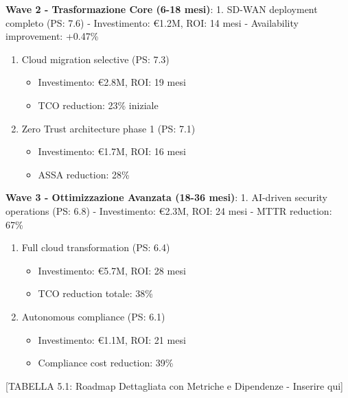 \documentclass[12pt,a4paper,oneside]{book}
\providecommand{\tightlist}{%
  \setlength{\itemsep}{0pt}\setlength{\parskip}{0pt}
}
\numberwithin{figure}{chapter} %
\numberwithin{table}{chapter}  %
\begin{document}
\textbf{Wave 2 - Trasformazione Core (6-18 mesi)}: 1. SD-WAN deployment
completo (PS: 7.6) - Investimento: €1.2M, ROI: 14 mesi - Availability
improvement: +0.47\%

\begin{enumerate}
\def\labelenumi{\arabic{enumi}.}
\setcounter{enumi}{1}
\tightlist
\item
  Cloud migration selective (PS: 7.3)

  \begin{itemize}
  \tightlist
  \item
    Investimento: €2.8M, ROI: 19 mesi
  \item
    TCO reduction: 23\% iniziale
  \end{itemize}
\item
  Zero Trust architecture phase 1 (PS: 7.1)

  \begin{itemize}
  \tightlist
  \item
    Investimento: €1.7M, ROI: 16 mesi
  \item
    ASSA reduction: 28\%
  \end{itemize}
\end{enumerate}

\textbf{Wave 3 - Ottimizzazione Avanzata (18-36 mesi)}: 1. AI-driven
security operations (PS: 6.8) - Investimento: €2.3M, ROI: 24 mesi - MTTR
reduction: 67\%

\begin{enumerate}
\def\labelenumi{\arabic{enumi}.}
\setcounter{enumi}{1}
\tightlist
\item
  Full cloud transformation (PS: 6.4)

  \begin{itemize}
  \tightlist
  \item
    Investimento: €5.7M, ROI: 28 mesi
  \item
    TCO reduction totale: 38\%
  \end{itemize}
\item
  Autonomous compliance (PS: 6.1)

  \begin{itemize}
  \tightlist
  \item
    Investimento: €1.1M, ROI: 21 mesi
  \item
    Compliance cost reduction: 39\%
  \end{itemize}
\end{enumerate}

{[}TABELLA 5.1: Roadmap Dettagliata con Metriche e Dipendenze - Inserire
qui{]}
\end{document}

